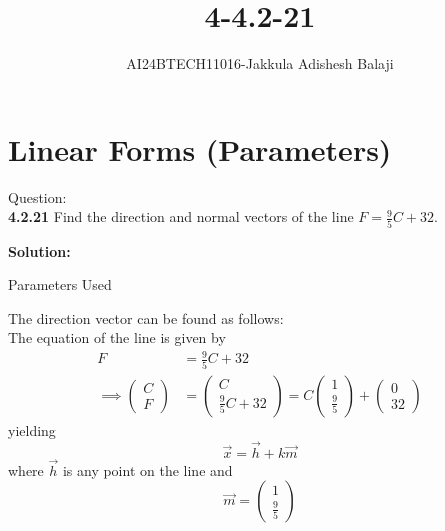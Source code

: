 \documentclass[journal]{IEEEtran}
\begin{document}

\setlength{\intextsep}{10pt} %

\title{4-4.2-21}
\author{AI24BTECH11016-Jakkula Adishesh Balaji}
\maketitle

\section*{\textbf{Linear Forms (Parameters)}}
\parindent 0pt
Question: \\
\textbf{4.2.21} Find the direction and normal vectors of the line \( F = \frac{9}{5}C + 32 \).

\textbf{Solution:}

\begin{table}[h!]    	
    \centering
     
    \caption{Parameters Used}
    \label{tab1-1.9-6}
\end{table}

The direction vector can be found as follows: \\
The equation of the line is given by
\begin{align}
	F &= \frac{9}{5}C + 32 \\
	\implies \begin{pmatrix} C \\ F \end{pmatrix} &= \begin{pmatrix} C \\ \frac{9}{5}C + 32 \end{pmatrix} = C\begin{pmatrix} 1 \\ \frac{9}{5} \end{pmatrix} + \begin{pmatrix} 0 \\ 32 \end{pmatrix}
\end{align}
yielding
\[
	\vec{x} = \vec{h} + k\vec{m}
\]
where \(\vec{h}\) is any point on the line and 
\[
	\vec{m} = \begin{pmatrix} 1 \\ \frac{9}{5} \end{pmatrix}
\]
\end{document}

